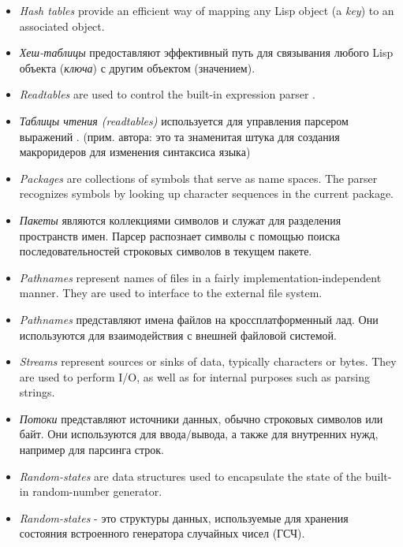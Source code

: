 \begin{itemize}
\item
\emph{Hash tables} provide an efficient way of mapping any
Lisp object (a \emph{key}) to an associated object.

\item
\emph{Хеш-таблицы} предоставляют эффективный путь для связывания
любого Lisp объекта (\emph{ключа}) с другим объектом (значением). 

\item
\emph{Readtables} are used to control the built-in expression parser
.

\item
\emph{Таблицы чтения (readtables)} используется для управления
парсером выражений . (прим. автора: это та знаменитая
штука для создания макроридеров для изменения синтаксиса языка) 

\item
\emph{Packages} are collections of symbols that serve as name spaces.
The parser recognizes symbols by looking up character sequences
in the current package.

\item
\emph{Пакеты} являются коллекциями символов и служат для разделения
пространств имен. Парсер распознает символы с помощью поиска
последовательностей строковых символов в текущем пакете. 

\item
\emph{Pathnames} represent names of files in a fairly implementation-independent
manner.  They are used to interface to the external file system.

\item
\emph{Pathnames} представляют имена файлов на кроссплатформенный
лад. Они используются для взаимодействия с внешней файловой
системой. 

\item
\emph{Streams} represent sources or sinks of data, typically characters
or bytes.  They are used to perform I/O, as well as for internal
purposes such as parsing strings.

\item
\emph{Потоки} представляют источники данных, обычно строковых
символов или байт. Они используются для ввода/вывода, а также для
внутренних нужд, например для парсинга строк. 

\item
\emph{Random-states} are data structures used to encapsulate the state
of the built-in random-number generator.

\item
\emph{Random-states} - это структуры данных, используемые для
хранения состояния встроенного генератора случайных чисел (ГСЧ).


\end{itemize}
